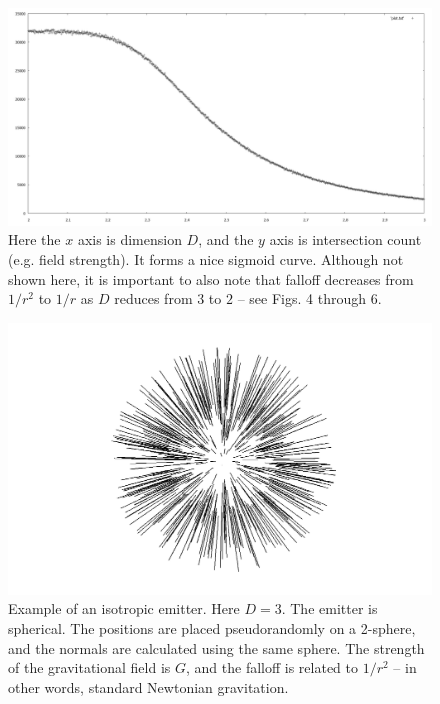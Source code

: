\documentclass[12pt]{article}
\begin{document}
\begin{figure} 
\centering
  \includegraphics[width = 5 in]{transition.png}
  \caption{
Here the $x$ axis is dimension $D$, and the $y$ axis is intersection count (e.g. field strength).
It forms a nice sigmoid curve.
Although not shown here, it is important to also note that falloff decreases from $1/r^2$ to $1/r$ as $D$ reduces from $3$ to $2$ -- see Figs. 4 through 6.
}
\end{figure}








\begin{figure} 
\centering
  \includegraphics[width = 5 in]{3.png}
  \caption{
Example of an isotropic emitter.
Here $D = 3$. 
The emitter is spherical.
The positions are placed pseudorandomly on a 2-sphere, and the normals are calculated using the same sphere.
The strength of the gravitational field is $G$, and the falloff is related to $1/r^2$ -- in other words, standard Newtonian gravitation.
}
\end{figure}
\end{document}
